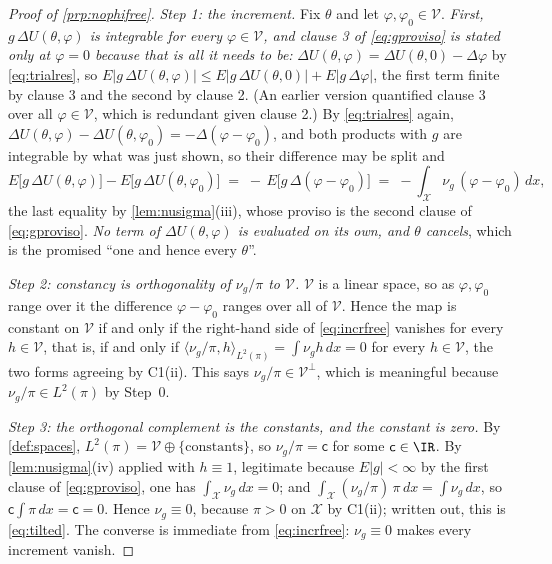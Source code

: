 \begin{proof}[Proof of \cref{prp:nophifree}]
\emph{Step 1: the increment.}
Fix $\theta$ and let $\varphi,\varphi_0\in\mathcal V$. \emph{First, $g\,\Delta U(\theta,\varphi)$ is
integrable for every $\varphi\in\mathcal V$, and clause 3 of \eqref{eq:gproviso} is stated only at
$\varphi=0$ because that is all it needs to be:} $\Delta U(\theta,\varphi)=\Delta U(\theta,0)-\Delta\varphi$
by \eqref{eq:trialres}, so $E|g\,\Delta U(\theta,\varphi)|\le E|g\,\Delta U(\theta,0)|+E|g\,\Delta\varphi|$,
the first term finite by clause 3 and the second by clause 2. (An earlier version quantified clause 3
over all $\varphi\in\mathcal V$, which is redundant given clause 2.) By \eqref{eq:trialres} again,
$\Delta U(\theta,\varphi)-\Delta U(\theta,\varphi_0)=-\Delta(\varphi-\varphi_0)$, and both products with
$g$ are integrable by what was just shown, so their difference may be split and
\begin{equation}\label{eq:incrfree}
E\big[g\,\Delta U(\theta,\varphi)\big]-E\big[g\,\Delta U(\theta,\varphi_0)\big]
\;=\;-\,E\big[g\,\Delta(\varphi-\varphi_0)\big]
\;=\;-\int_{\mathcal X}\nu_g\,(\varphi-\varphi_0)\,dx ,
\end{equation}
the last equality by \cref{lem:nusigma}(iii), whose proviso is the second clause of
\eqref{eq:gproviso}. \emph{No term of $\Delta U(\theta,\varphi)$ is evaluated on its own, and $\theta$
cancels}, which is the promised ``one and hence every $\theta$''.

\emph{Step 2: constancy is orthogonality of $\nu_g/\pi$ to $\mathcal V$.}
$\mathcal V$ is a linear space, so as $\varphi,\varphi_0$ range over it the difference
$\varphi-\varphi_0$ ranges over all of $\mathcal V$. Hence the map is constant on $\mathcal V$ if and
only if the right-hand side of \eqref{eq:incrfree} vanishes for every $h\in\mathcal V$, that is, if and
only if $\langle\nu_g/\pi,h\rangle_{L^{2}(\pi)}=\int\nu_gh\,dx=0$ for every $h\in\mathcal V$, the two forms
agreeing by C1(ii). This says $\nu_g/\pi\in\mathcal V^{\perp}$, which is meaningful because
$\nu_g/\pi\in L^{2}(\pi)$
by Step~0.

\emph{Step 3: the orthogonal complement is the constants, and the constant is zero.}
By \cref{def:spaces}, $L^{2}(\pi)=\mathcal V\oplus\{\text{constants}\}$, so $\nu_g/\pi=\mathsf c$ for some
$\mathsf c\in\IR$. By \cref{lem:nusigma}(iv) applied with $h\equiv1$, legitimate because
$E|g|<\infty$ by the first clause of \eqref{eq:gproviso}, one has $\int_{\mathcal X}\nu_g\,dx=0$; and
$\int_{\mathcal X}(\nu_g/\pi)\,\pi\,dx=\int\nu_g\,dx$, so $\mathsf c\int\pi\,dx=\mathsf c=0$. Hence
$\nu_g\equiv0$, because $\pi>0$ on $\mathcal X$ by C1(ii); written out, this is \eqref{eq:tilted}. The
converse is immediate from \eqref{eq:incrfree}: $\nu_g\equiv0$ makes every increment vanish.
\end{proof}

